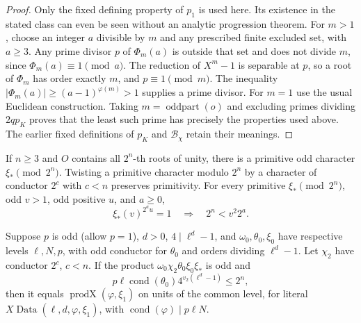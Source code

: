 \begin{proof}
Only the fixed defining property of $p_{\!1}$ is used here.
Its existence in the stated class can even be seen without an
analytic progression theorem.  For $m>1$, choose an integer $a$
divisible by $m$ and any prescribed finite excluded set, with
$a\ge3$.  Any prime divisor $p$ of $\Phi_m(a)$ is outside that
set and does not divide $m$, since $\Phi_m(a)\equiv1\pmod a$.
The reduction of $X^m-1$ is separable at $p$, so a root of
$\Phi_m$ has order exactly $m$, and $p\equiv1\pmod m$.
The inequality $|\Phi_m(a)|\ge(a-1)^{\varphi(m)}>1$ supplies a
prime divisor.  For $m=1$ use the usual Euclidean construction.
Taking $m=\operatorname{oddpart}(o)$ and excluding primes dividing
$2qp_K$ proves that the least such prime has precisely the
properties used above.  The earlier fixed definitions of $p_K$
and $\mathcal B_\chi$ retain their meanings.
\end{proof}

\begin{proposition}
\label{prop:ax-dyadic}
If $n\ge3$ and $O$ contains all $2^n$-th roots of unity, there is a
primitive odd character $\xi_*\pmod{2^n}$.
Twisting a primitive character modulo $2^n$ by a character of
conductor $2^c$ with $c<n$ preserves primitivity.
For every primitive $\xi_*\pmod{2^n}$, odd $v>1$, odd positive $u$,
and $a\ge0$,
\[
 \xi_*(v)^{2^a u}=1\quad\Longrightarrow\quad
                     2^n<v^2 2^a.
 \tag{AX.10}
\]

Suppose $p$ is odd (allow $p=1$), $d>0$,
$4\mid\ell^d-1$, and $\omega_0,\theta_0,\xi_0$ have respective
levels $\ell,N,p$, with odd conductor for $\theta_0$ and orders
dividing $\ell^d-1$.  Let $\chi_2$ have conductor $2^c$, $c<n$.
If the product $\omega_0\chi_2\theta_0\xi_0\xi_*$ is odd and
\[
       p\ell\operatorname{cond}(\theta_0)
                  4^{v_2(\ell^d-1)}\le2^n,
 \tag{AX.11}
\]
then it equals $\operatorname{prodX}(\varphi,\xi_1)$ on units
of the common level, for literal $X\!\operatorname{Data}
(\ell,d,\varphi,\xi_1)$, with
$\operatorname{cond}(\varphi)\mid p\ell N$.
\end{proposition}


